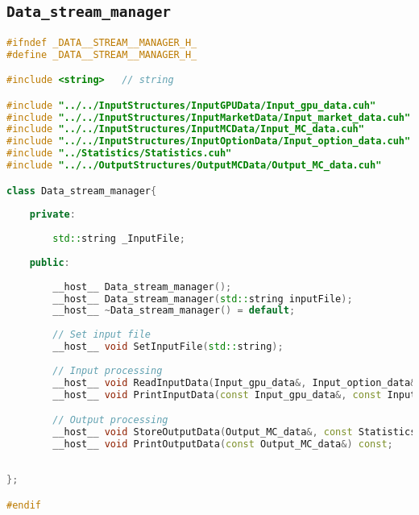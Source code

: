 \subsection{\texttt{Data\_stream\_manager}}
\lipsum[1-3]

\begin{lstlisting}[language=C++, caption={\texttt{libraries/CoreLibraries/DataStreamManager/Data\_stream\_manager.cuh}}]
#ifndef _DATA__STREAM__MANAGER_H_
#define _DATA__STREAM__MANAGER_H_

#include <string>	// string

#include "../../InputStructures/InputGPUData/Input_gpu_data.cuh"
#include "../../InputStructures/InputMarketData/Input_market_data.cuh"
#include "../../InputStructures/InputMCData/Input_MC_data.cuh"
#include "../../InputStructures/InputOptionData/Input_option_data.cuh"
#include "../Statistics/Statistics.cuh"
#include "../../OutputStructures/OutputMCData/Output_MC_data.cuh"

class Data_stream_manager{
	
	private:
	
		std::string _InputFile;
	
	public:
	
		__host__ Data_stream_manager();
		__host__ Data_stream_manager(std::string inputFile);
		__host__ ~Data_stream_manager() = default;
		
		// Set input file
		__host__ void SetInputFile(std::string);
	
		// Input processing
		__host__ void ReadInputData(Input_gpu_data&, Input_option_data&, Input_market_data&, Input_MC_data&) const;
		__host__ void PrintInputData(const Input_gpu_data&, const Input_option_data&, const Input_market_data&, const Input_MC_data&) const;

		// Output processing
		__host__ void StoreOutputData(Output_MC_data&, const Statistics exactResults, const Statistics eulerResults, double elapsedTime, char hostOrDevice) const;
		__host__ void PrintOutputData(const Output_MC_data&) const;		
		
	
};

#endif
\end{lstlisting}

